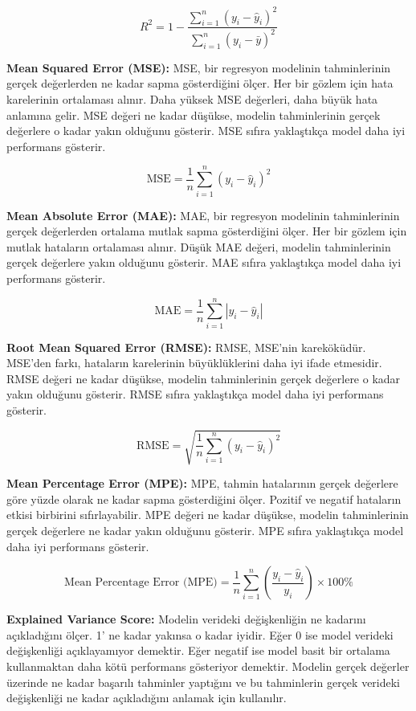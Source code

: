 \[R^2 = 1 - \frac{\sum_{i=1}^{n} (y_i - \hat{y}_i)^2}{\sum_{i=1}^{n} (y_i - \bar{y})^2}\]

\textbf{Mean Squared Error (MSE):} MSE, bir regresyon modelinin tahminlerinin gerçek değerlerden ne kadar sapma gösterdiğini ölçer. Her bir gözlem için hata karelerinin ortalaması alınır. Daha yüksek MSE değerleri, daha büyük hata anlamına gelir. MSE değeri ne kadar düşükse, modelin tahminlerinin gerçek değerlere o kadar yakın olduğunu gösterir. MSE sıfıra yaklaştıkça model daha iyi performans gösterir.

\[\text{MSE} = \frac{1}{n} \sum_{i=1}^{n} (y_i - \hat{y}_i)^2\]

\textbf{Mean Absolute Error (MAE):} MAE, bir regresyon modelinin tahminlerinin gerçek değerlerden ortalama mutlak sapma gösterdiğini ölçer. Her bir gözlem için mutlak hataların ortalaması alınır. Düşük MAE değeri, modelin tahminlerinin gerçek değerlere yakın olduğunu gösterir. MAE sıfıra yaklaştıkça model daha iyi performans gösterir.

\[\text{MAE} = \frac{1}{n} \sum_{i=1}^{n} |y_i - \hat{y}_i|\]

\textbf{Root Mean Squared Error (RMSE):} RMSE, MSE'nin kareköküdür. MSE'den farkı, hataların karelerinin büyüklüklerini daha iyi ifade etmesidir. RMSE değeri ne kadar düşükse, modelin tahminlerinin gerçek değerlere o kadar yakın olduğunu gösterir. RMSE sıfıra yaklaştıkça model daha iyi performans gösterir.

\[\text{RMSE} = \sqrt{\frac{1}{n} \sum_{i=1}^{n} (y_i - \hat{y}_i)^2}\]

\textbf{Mean Percentage Error (MPE):} MPE, tahmin hatalarının gerçek değerlere göre yüzde olarak ne kadar sapma gösterdiğini ölçer. Pozitif ve negatif hataların etkisi birbirini sıfırlayabilir. MPE değeri ne kadar düşükse, modelin tahminlerinin gerçek değerlere ne kadar yakın olduğunu gösterir. MPE sıfıra yaklaştıkça model daha iyi performans gösterir.

\[\text{Mean Percentage Error (MPE)} = \frac{1}{n} \sum_{i=1}^{n} \left( \frac{y_i - \hat{y}_i}{y_i} \right) \times 100\%\]

\textbf{Explained Variance Score:} Modelin verideki değişkenliğin ne kadarını açıkladığını ölçer. 1' ne kadar yakınsa o kadar iyidir. Eğer 0 ise model verideki değişkenliği açıklayamıyor demektir. Eğer negatif ise model basit bir ortalama kullanmaktan daha kötü performans gösteriyor demektir. Modelin gerçek değerler üzerinde ne kadar başarılı tahminler yaptığını ve bu tahminlerin gerçek verideki değişkenliği ne kadar açıkladığını anlamak için kullanılır.

